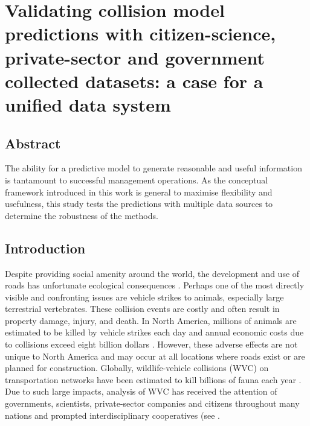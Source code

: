 \chapter{Validating collision model predictions with citizen-science, private-sector and government collected datasets: a case for a unified data system}\label{sec:val}
\newpage

\begin{localsize}{10}
\section*{\centering Abstract}

The ability for a predictive model to generate reasonable and useful information is tantamount to successful management operations.  As the conceptual framework introduced in this work is general to maximise flexibility and usefulness, this study tests the predictions with multiple data sources to determine the robustness of the methods.

\end{localsize}

\newpage
\section{Introduction}

Despite providing social amenity around the world, the development and use of roads has unfortunate ecological consequences \citep{form03}. Perhaps one of the most directly visible and confronting issues are vehicle strikes to animals, especially large terrestrial vertebrates. These collision events are costly and often result in property damage, injury, and death. In North America, millions of animals are estimated to be killed by vehicle strikes each day \citep{form98} and annual economic costs due to collisions exceed eight billion dollars \citep{huij07}. However, these adverse effects are not unique to North America and may occur at all locations where roads exist or are planned for construction.  Globally, wildlife-vehicle collisions (WVC) on transportation networks have been estimated to kill billions of fauna each year \citep{seil06}. Due to such large impacts, analysis of WVC has received the attention of governments, scientists, private-sector companies and citizens throughout many nations and prompted interdisciplinary cooperatives (see \cite{rvdr15}.

